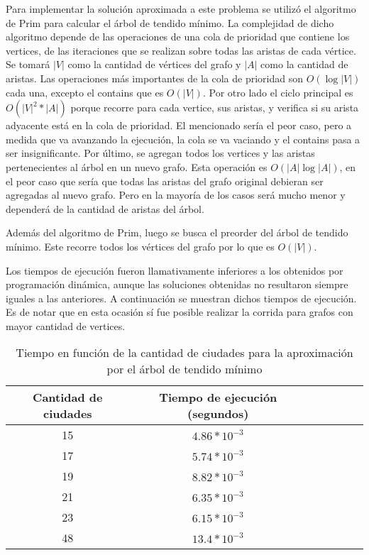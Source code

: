 \documentclass[a4paper,10pt]{article}
\begin{document}
Para implementar la solución aproximada a este problema se utilizó el algoritmo de Prim para calcular el árbol de tendido mínimo. La complejidad de dicho algoritmo depende de las operaciones de una cola de prioridad que contiene los vertices, de las iteraciones que se realizan sobre todas las aristas de cada vértice. Se tomará $|V|$ como la cantidad de vértices del grafo y $|A|$ como la cantidad de aristas. 
Las operaciones más importantes de la cola de prioridad son $O(\log{|V|})$ cada una, excepto el contains que es $O(|V|)$.
Por otro lado el ciclo principal es $O(|V|^2 *|A|)$ porque recorre para cada vertice, sus aristas, y verifica si su arista adyacente está en la cola de prioridad. El mencionado sería el peor caso, pero a medida que va avanzando la ejecución, la cola se va vaciando y el contains pasa a ser insignificante. Por último, se agregan todos los vertices y las aristas pertenecientes al árbol en un nuevo grafo. Esta operación es $O(|A| \log{|A|})$, en el peor caso que sería que todas las aristas del grafo original debieran ser agregadas al nuevo grafo. Pero en la mayoría de los casos será mucho menor y dependerá de la cantidad de aristas del árbol.

Además del algoritmo de Prim, luego se busca el preorder del árbol de tendido mínimo. Este recorre todos los vértices del grafo por lo que es $O(|V|)$.

Los tiempos de ejecución fueron llamativamente inferiores a los obtenidos por programación dinámica, aunque las soluciones obtenidas no resultaron siempre iguales a las anteriores. A continuación se muestran dichos tiempos de ejecución. Es de notar que en esta ocasión sí fue posible realizar la corrida para grafos con mayor cantidad de vertices.

\begin{table}[H]
\centering
\begin{tabular}{|c|c|c|c|c|c|c|}
\hline
Cantidad de ciudades	& Tiempo de ejecución (segundos)\\\hline
15						& $4.86 * 10^{-3}$\\\hline
17						& $5.74 * 10^{-3}$\\\hline
19						& $8.82 * 10^{-3}$\\\hline
21						& $6.35 * 10^{-3}$\\\hline
23						& $6.15 * 10^{-3}$\\\hline
48						& $13.4 * 10^{-3}$\\\hline
\end{tabular}
\caption{Tiempo en función de la cantidad de ciudades para la aproximación por el árbol de tendido mínimo}
\label{tab:held}
\end{table}
\end{document}
